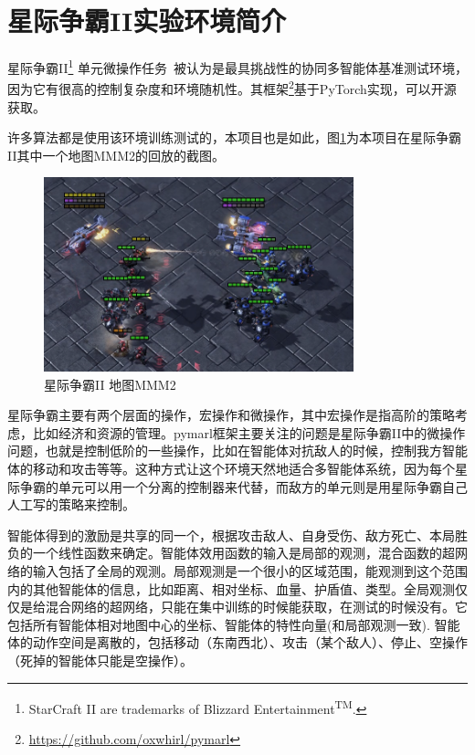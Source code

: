 \section{星际争霸II实验环境简介}
星际争霸II\footnote{StarCraft II are trademarks of Blizzard Entertainment\textsuperscript{TM}.} 单元微操作任务~\cite{samvelyan2019starcraft}被认为是最具挑战性的协同多智能体基准测试环境，因为它有很高的控制复杂度和环境随机性。其框架\footnote{\url{https://github.com/oxwhirl/pymarl}}基于PyTorch实现，可以开源获取。

许多算法\cite{foerster2017stabilising, foerster2018counterfactual, rashid2018qmix, mahajan2019maven}都是使用该环境训练测试的，本项目也是如此，图\ref{fig:starcraft2-MMM2}为本项目在星际争霸II其中一个地图MMM2的回放的截图。

\begin{figure}[htb]
    \centering
    \includegraphics[width=0.8\textwidth]{figures/common/starcraft2-MMM2.png}
    \caption{星际争霸II 地图MMM2}
    \label{fig:starcraft2-MMM2}
  \end{figure}


星际争霸主要有两个层面的操作，宏操作和微操作，其中宏操作是指高阶的策略考虑，比如经济和资源的管理。pymarl框架主要关注的问题是星际争霸II中的微操作问题，也就是控制低阶的一些操作，比如在智能体对抗敌人的时候，控制我方智能体的移动和攻击等等。这种方式让这个环境天然地适合多智能体系统，因为每个星际争霸的单元可以用一个分离的控制器来代替，而敌方的单元则是用星际争霸自己人工写的策略来控制。

智能体得到的激励是共享的同一个，根据攻击敌人、自身受伤、敌方死亡、本局胜负的一个线性函数来确定。智能体效用函数的输入是局部的观测，混合函数的超网络的输入包括了全局的观测。局部观测是一个很小的区域范围，能观测到这个范围内的其他智能体的信息，比如距离、相对坐标、血量、护盾值、类型。全局观测仅仅是给混合网络的超网络，只能在集中训练的时候能获取，在测试的时候没有。它包括所有智能体相对地图中心的坐标、智能体的特性向量(和局部观测一致). 智能体的动作空间是离散的，包括移动（东南西北）、攻击（某个敌人）、停止、空操作（死掉的智能体只能是空操作）。

